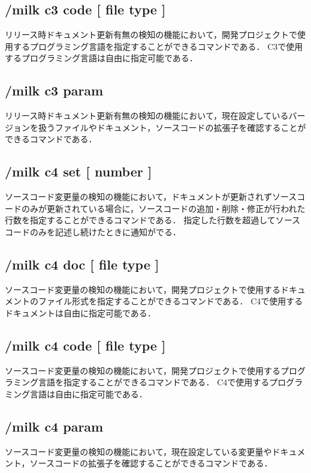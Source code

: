 \subsection*{/milk c3 code [ file type ]}
リリース時ドキュメント更新有無の検知の機能において，開発プロジェクトで使用するプログラミング言語を指定することができるコマンドである．
C3で使用するプログラミング言語は自由に指定可能である．

\subsection*{/milk c3 param}
リリース時ドキュメント更新有無の検知の機能において，現在設定しているバージョンを扱うファイルやドキュメント，ソースコードの拡張子を確認することができるコマンドである．

\subsection*{/milk c4 set [ number ]}
ソースコード変更量の検知の機能において，ドキュメントが更新されずソースコードのみが更新されている場合に，ソースコードの追加・削除・修正が行われた行数を指定することができるコマンドである．
指定した行数を超過してソースコードのみを記述し続けたときに通知がでる．

\subsection*{/milk c4 doc [ file type ]}
ソースコード変更量の検知の機能において，開発プロジェクトで使用するドキュメントのファイル形式を指定することができるコマンドである．
C4で使用するドキュメントは自由に指定可能である．

\subsection*{/milk c4 code [ file type ]}
ソースコード変更量の検知の機能において，開発プロジェクトで使用するプログラミング言語を指定することができるコマンドである．
C4で使用するプログラミング言語は自由に指定可能である．

\subsection*{/milk c4 param}
ソースコード変更量の検知の機能において，現在設定している変更量やドキュメント，ソースコードの拡張子を確認することができるコマンドである．

